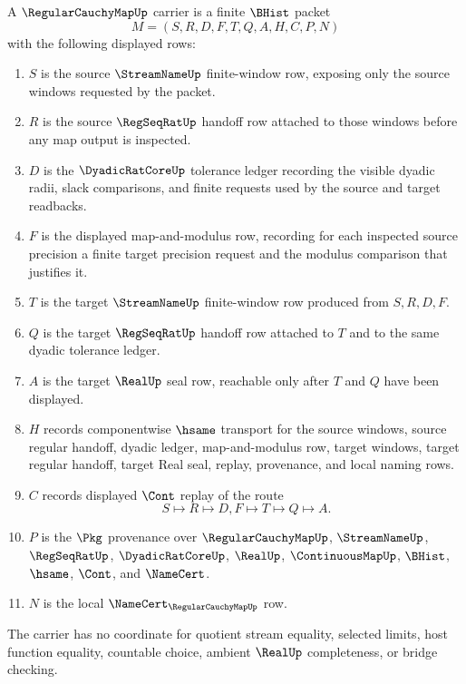 \begin{definition}
\label{def:regular-cauchy-map-carrier}
A $\RegularCauchyMapUp$ carrier is a finite $\BHist$ packet
$$
M=(S,R,D,F,T,Q,A,H,C,P,N)
$$
with the following displayed rows:
\begin{enumerate}
\item $S$ is the source $\StreamNameUp$ finite-window row, exposing only the source windows requested by the packet.
\item $R$ is the source $\RegSeqRatUp$ handoff row attached to those windows before any map output is inspected.
\item $D$ is the $\DyadicRatCoreUp$ tolerance ledger recording the visible dyadic radii, slack comparisons, and finite requests used by the source and target readbacks.
\item $F$ is the displayed map-and-modulus row, recording for each inspected source precision a finite target precision request and the modulus comparison that justifies it.
\item $T$ is the target $\StreamNameUp$ finite-window row produced from $S,R,D,F$.
\item $Q$ is the target $\RegSeqRatUp$ handoff row attached to $T$ and to the same dyadic tolerance ledger.
\item $A$ is the target $\RealUp$ seal row, reachable only after $T$ and $Q$ have been displayed.
\item $H$ records componentwise $\hsame$ transport for the source windows, source regular handoff, dyadic ledger, map-and-modulus row, target windows, target regular handoff, target Real seal, replay, provenance, and local naming rows.
\item $C$ records displayed $\Cont$ replay of the route
$$
S\longmapsto R\longmapsto D,F\longmapsto T\longmapsto Q\longmapsto A .
$$
\item $P$ is the $\Pkg$ provenance over $\RegularCauchyMapUp$, $\StreamNameUp$, $\RegSeqRatUp$, $\DyadicRatCoreUp$, $\RealUp$, $\ContinuousMapUp$, $\BHist$, $\hsame$, $\Cont$, and $\NameCert$.
\item $N$ is the local $\NameCert_{\RegularCauchyMapUp}$ row.
\end{enumerate}
The carrier has no coordinate for quotient stream equality, selected limits, host function equality, countable choice, ambient $\RealUp$ completeness, or bridge checking.
\end{definition}

